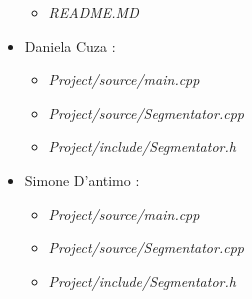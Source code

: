 \begin{itemize}
\begin{itemize}
                \item \textit{README.MD}
            \end{itemize}
        \item Daniela Cuza :
            \begin{itemize}
                \item \textit{Project/source/main.cpp}
                \item \textit{Project/source/Segmentator.cpp}
                \item \textit{Project/include/Segmentator.h}
            \end{itemize}
        \item Simone D'antimo :
            \begin{itemize}
                \item \textit{Project/source/main.cpp}
                \item \textit{Project/source/Segmentator.cpp}
                \item \textit{Project/include/Segmentator.h}
            \end{itemize}
    \end{itemize}